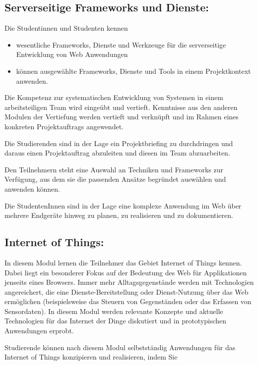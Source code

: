 \subsection*{Serverseitige Frameworks und
Dienste:}\label{serverseitige-frameworks-und-dienste}

Die Studentinnen und Studenten kennen

\begin{itemize}
\tightlist
\item
  wesentliche Frameworks, Dienste und Werkzeuge für die serverseitige
  Entwicklung von Web Anwendungen
\item
  können ausgewählte Frameworks, Dienste und Tools in einem
  Projektkontext anwenden.
\end{itemize}

Die Kompetenz zur systematischen Entwicklung von Systemen in einem
arbeitsteiligen Team wird eingeübt und vertieft. Kenntnisse aus den
anderen Modulen der Vertiefung werden vertieft und verknüpft und im
Rahmen eines konkreten Projektauftrags angewendet.

Die Studierenden sind in der Lage ein Projektbriefing zu durchdringen
und daraus einen Projektauftrag abzuleiten und diesen im Team
abzuarbeiten.

Den Teilnehmern steht eine Auswahl an Techniken und Frameworks zur
Verfügung, aus dem sie die passenden Ansätze begründet auswählen und
anwenden können.

Die StudentenInnen sind in der Lage eine komplexe Anwendung im Web über
mehrere Endgeräte hinweg zu planen, zu realisieren und zu dokumentieren.

\subsection*{Internet of Things:}\label{internet-of-things}

In diesem Modul lernen die Teilnehmer das Gebiet Internet of Things
kennen. Dabei liegt ein besonderer Fokus auf der Bedeutung des Web für
Applikationen jenseits eines Browsers. Immer mehr Alltagsgegenstände
werden mit Technologien angereichert, die eine Dienste-Bereitstellung
oder Dienst-Nutzung über das Web ermöglichen (beispielsweise das Steuern
von Gegenständen oder das Erfassen von Sensordaten). In diesem Modul
werden relevante Konzepte und aktuelle Technologien für das Internet der
Dinge diskutiert und in prototypischen Anwendungen erprobt.

Studierende können nach diesem Modul selbstständig Anwendungen für das
Internet of Things konzipieren und realisieren, indem Sie

